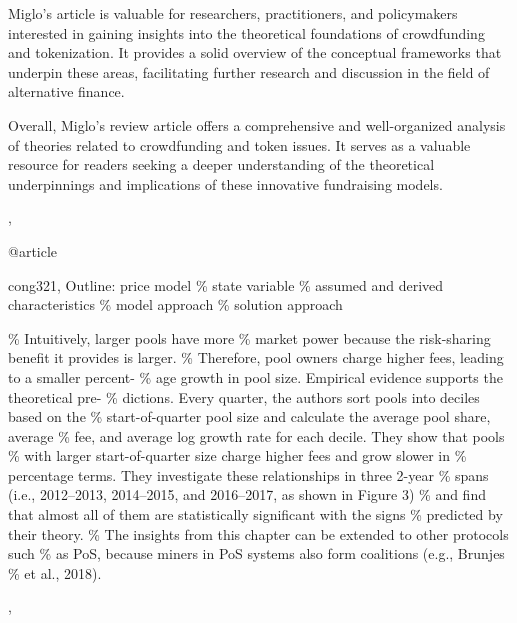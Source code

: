 {{        Miglo's article is valuable for researchers, practitioners, and policymakers interested in gaining insights into the theoretical foundations of crowdfunding and tokenization. It provides a solid overview of the conceptual frameworks that underpin these areas, facilitating further research and discussion in the field of alternative finance.

        Overall, Miglo's review article offers a comprehensive and well-organized analysis of theories related to crowdfunding and token issues. It serves as a valuable resource for readers seeking a deeper understanding of the theoretical underpinnings and implications of these innovative fundraising models.
    },
}

%
@article{cong321,
        Outline: price model \% state variable \% assumed and derived characteristics \% model approach \% solution approach

        \% Intuitively, larger pools have more \% market power because the risk-sharing benefit it provides is larger. \% Therefore, pool owners charge higher fees, leading to a smaller percent- \% age growth in pool size. Empirical evidence supports the theoretical pre- \% dictions. Every quarter, the authors sort pools into deciles based on the \% start-of-quarter pool size and calculate the average pool share, average \% fee, and average log growth rate for each decile. They show that pools \% with larger start-of-quarter size charge higher fees and grow slower in \% percentage terms. They investigate these relationships in three 2-year \% spans (i.e., 2012–2013, 2014–2015, and 2016–2017, as shown in Figure 3) \% and find that almost all of them are statistically significant with the signs \% predicted by their theory. \% The insights from this chapter can be extended to other protocols such \% as PoS, because miners in PoS systems also form coalitions (e.g., Brunjes \% et al., 2018).
    },
